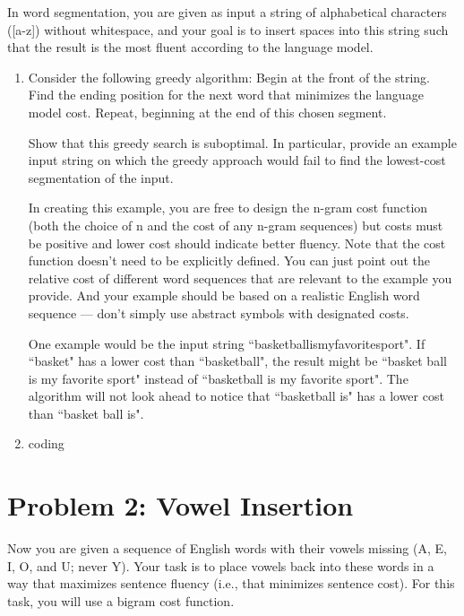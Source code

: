 \documentclass[10pt]{article}
\begin{document}
In word segmentation, you are given as input a string of alphabetical characters ([a-z]) without whitespace, and your goal is to insert spaces into this string such that the result is the most fluent according to the language model.

\begin{enumerate}[label=(\alph*)]

  \item  Consider the following greedy algorithm: Begin at the front of the string. Find the ending position for the next word that minimizes the language model cost. Repeat, beginning at the end of this chosen segment.

Show that this greedy search is suboptimal. In particular, provide an example input string on which the greedy approach would fail to find the lowest-cost segmentation of the input.

In creating this example, you are free to design the n-gram cost function (both the choice of n and the cost of any n-gram sequences) but costs must be positive and lower cost should indicate better fluency. Note that the cost function doesn't need to be explicitly defined. You can just point out the relative cost of different word sequences that are relevant to the example you provide. And your example should be based on a realistic English word sequence — don't simply use abstract symbols with designated costs. 

	One example would be the input string ``basketballismyfavoritesport". If ``basket" has a lower cost than ``basketball", the result might be ``basket ball is my favorite sport" instead of ``basketball is my favorite sport". The algorithm will not look ahead to notice that ``basketball is" has a lower cost than ``basket ball is".
  
  \item coding

\end{enumerate}

\section*{\normalsize Problem 2: Vowel Insertion}

Now you are given a sequence of English words with their vowels missing (A, E, I, O, and U; never Y). Your task is to place vowels back into these words in a way that maximizes sentence fluency (i.e., that minimizes sentence cost). For this task, you will use a bigram cost function.
\smallskip
\end{document}
